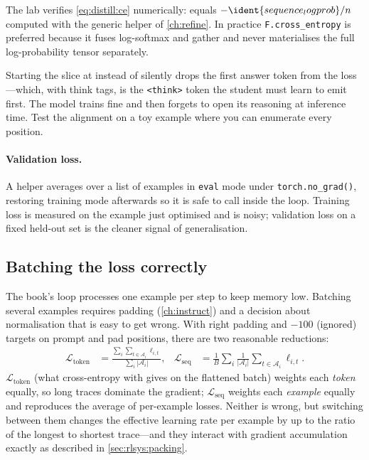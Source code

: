 The lab verifies \cref{eq:distill:ce} numerically:  equals
$-\ident{sequence_logprob}/n$ computed with the generic helper of \cref{ch:refine}. In
practice \texttt{F.cross\_entropy} is preferred because it fuses log-softmax and gather and
never materialises the full log-probability tensor separately.

\begin{pitfall}
Starting the slice at  instead of  silently drops the
first answer token from the loss---which, with think tags, is the \texttt{<think>} token the
student must learn to emit first. The model trains fine and then forgets to open its
reasoning at inference time. Test the alignment on a toy example where you can enumerate every
position.
\end{pitfall}

\paragraph{Validation loss.} A helper averages  over a list of examples
in \texttt{eval} mode under \texttt{torch.no\_grad()}, restoring training mode afterwards so it
is safe to call inside the loop. Training loss is measured on the example just optimised and is
noisy; validation loss on a fixed held-out set is the cleaner signal of generalisation.

\subsection{Batching the loss correctly}

The book's loop processes one example per step to keep memory low. Batching several examples
requires padding (\cref{ch:instruct}) and a decision about normalisation that is easy to get
wrong. With right padding and $-100$ (ignored) targets on prompt and pad positions, there are
two reasonable reductions:
\begin{align}
\mathcal{L}_{\text{token}} &= \frac{\sum_i \sum_{t\in\mathcal{A}_i} \ell_{i,t}}{\sum_i |\mathcal{A}_i|},&
\mathcal{L}_{\text{seq}} &= \frac{1}{B}\sum_i \frac{1}{|\mathcal{A}_i|}\sum_{t\in\mathcal{A}_i}\ell_{i,t}.
\end{align}
$\mathcal{L}_{\text{token}}$ (what cross-entropy with  gives on the
flattened batch) weights each \emph{token} equally, so long traces dominate the gradient;
$\mathcal{L}_{\text{seq}}$ weights each \emph{example} equally and reproduces the average of
per-example losses. Neither is wrong, but switching between them changes the effective learning
rate per example by up to the ratio of the longest to shortest trace---and they interact with
gradient accumulation exactly as described in \cref{sec:rlsys:packing}.

